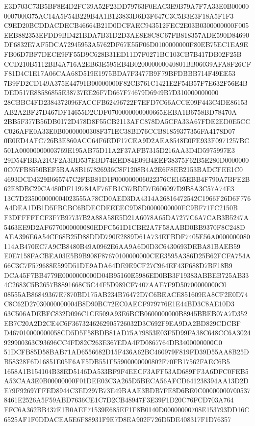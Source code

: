 \documentclass[UTF8,fontset=fandol,zihao=-4,a4paper]{ctexart}
\begin{document}
{{E3D703C73B5BF8E4D2FC39A52F23DD79763F0EAC3E9B79A7F7A33E0B000000007000375AC14A5F54B229B4A1B123833D6D3F647C3C5B3E3F18A5F1F3
C9ED20BCDDACDECB46664B21D0DCFAEC943512FEC2E03B0300000000F005EEB882353EFDD9BD421BDA7B31D2D3AE8E8C8C67FB818357ADE590D84690
DF6832E7AF5DCA72945953A5762DF67E55F06D0100000000F80EB75EC1EA9EFB06D7BF7DECE9FF55D9C628B31ED11D7F0271BC103CB7B417DB02F25B
CCD210B5112BB4A716A2EB63E595EB4B020000000040801BB06039AFA8F26CFF81D4C1E17A06CAA68D519E1975BDA7F3477B9F79BFDBBB714F49EE53
7B9FD2CD149A375E44791B00000000F82CB761C1421E2F54B57F7E632F56E4BDED517E88586855E38737EE26F7D667F74679D6949B7D310000000000
28CBBC4FD2384372096FACCFB62496722F7EFD7C66ACCE09F443C4DE86153AB2A2BF27D467DF14655D2CDF0700000000000665EEBA1B6758BD78470A
2BB5F377B56DB0172D478D8F55CB2113AFC878DA5CFA33A67FDE2ED0E5CCC026AFE0A33E0B00000000308F371EC38BD76CCB81859377356FA4178D07
0E0ED4AFC726B3E860ACC64F6EDF17CEA9D2AEA8548E0FE933F0971257BC501A00000000003769E195AB75D11A2F37AFB7315D216AA3D4D5975997E3
29D54FBBA21CF2A3BD537EBD74EED84E09B4EEF38375F62B5E280D00000000C07FB8550BEF5BAA8B167826936C8F1208B4A2E6F8EB2153BADCFEE1C0
4693DCD4329B665747C2FBB81D1F000000006022376CE165EBB4F790A7BFE2B62E8DBC29CA480DF119784AF76FB1C67BDD7E606097D9B8A3C57A74E3
13C7D235000000004023555A78CD0AED3DA4314A26816472542C1966F26D6F776A4DEA1DB1D5FBCBC6BDECDEEEEC9D8D0000000000FC9BF71FC2150B
F3DFFFFFCF3F7B97737B2A88A58E5D21A6078A65DA7277C6A7CAB3B5247A5463EE9D2AF6770000000080EDFC561D1CBE2A7F58AABD0BB9370F8C248D
AEA396E6A54CF68B25D88DDD790E2889D61A734EFBDF7405E56A0000000080114AB470EC7A9CB8480B49A0962E6AA9A6D0D3C6430693DEBA81BAEB59
E0E7158FACBEA03E5B9B908F87670100000000CEE3595A386D25B62FCFA754A66C3C7F579688E599D51DE9ADA64DE9E9CF27C964EF43F688D7BF18B9
DCA45F7BB4779E0000000000D04B95160E5986ED0BB3F19383ABBEB725AB334C2683C5B2657B8891668C5C44F5D989CF7407AAE7F9D50700000000C0
08555AB86849367E7870BD175AB234B76472D7C6BEACE851609EA8CF2E0D74C8C62D27030000000004B8D90BC72EC0AECF979776E1E44BD3C8AE10D3
63C506ADEBFC832D096C1CE509A93E6BCB0600000000B8945BBEB07A7D352EB7C20A2D2CE4C6F3673246262905726032D3C692F9EA9DA2BD829CDCBF
D467010000000058CD5D5F58BDB81AD75A79853E03F5D99FA38C648CC6A3024929900363C93696CC4FD82C263E367EDA4FD0867764DB3400000000C0
51DCFB85D58BAB71AD6556682D15F436A62BC460979F819FD39D55AA8B25DB58328F6D16851E05F6AF5DB551F55900000000802F70FB17562FAEC6B5
1658A1B154104B38ED5146DA533BF9F4EECF3AFF53AD689FF3A6DFC0FEB5A53CAA3E0B00000000F01DEE03C3A265D5BECA56AFCD641238394AA13D2D
E79F92697FFED8944C3ED297B73E49BAAE3BDB7FE8D6BE0C000000007005378461E2526A5F59ABD7636CE1C7D2CB48947F3E39F1D20C76FCD703A764
EFC6A362BB437E1B0AEF71539E685EF1F8B0140D00000000708E153793DD16C6525AF1F0DDACEA5E6F88931F9E7D8EA902F726D5DE408317F1D76357
}}
\end{document}
